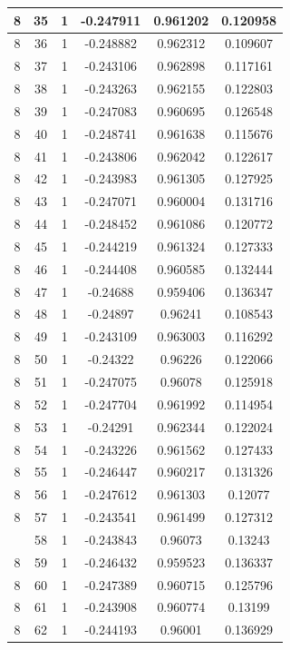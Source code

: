 \documentclass[12pt,a4paper]{article}
\numberwithin{equation}{section}
\numberwithin{figure}{section}
\numberwithin{table}{section}
\begin{document}
\begin{longtable}{|c|c|c|c|c|c|}
8 & 35 & 1 & -0.247911 & 0.961202 & 0.120958 \\ \hline
8 & 36 & 1 & -0.248882 & 0.962312 & 0.109607 \\ \hline
8 & 37 & 1 & -0.243106 & 0.962898 & 0.117161 \\ \hline
8 & 38 & 1 & -0.243263 & 0.962155 & 0.122803 \\ \hline
8 & 39 & 1 & -0.247083 & 0.960695 & 0.126548 \\ \hline
8 & 40 & 1 & -0.248741 & 0.961638 & 0.115676 \\ \hline
8 & 41 & 1 & -0.243806 & 0.962042 & 0.122617 \\ \hline
8 & 42 & 1 & -0.243983 & 0.961305 & 0.127925 \\ \hline
8 & 43 & 1 & -0.247071 & 0.960004 & 0.131716 \\ \hline
8 & 44 & 1 & -0.248452 & 0.961086 & 0.120772 \\ \hline
8 & 45 & 1 & -0.244219 & 0.961324 & 0.127333 \\ \hline
8 & 46 & 1 & -0.244408 & 0.960585 & 0.132444 \\ \hline
8 & 47 & 1 & -0.24688 & 0.959406 & 0.136347 \\ \hline
8 & 48 & 1 & -0.24897 & 0.96241 & 0.108543 \\ \hline
8 & 49 & 1 & -0.243109 & 0.963003 & 0.116292 \\ \hline
8 & 50 & 1 & -0.24322 & 0.96226 & 0.122066 \\ \hline
8 & 51 & 1 & -0.247075 & 0.96078 & 0.125918 \\ \hline
8 & 52 & 1 & -0.247704 & 0.961992 & 0.114954 \\ \hline
8 & 53 & 1 & -0.24291 & 0.962344 & 0.122024 \\ \hline
8 & 54 & 1 & -0.243226 & 0.961562 & 0.127433 \\ \hline
8 & 55 & 1 & -0.246447 & 0.960217 & 0.131326 \\ \hline
8 & 56 & 1 & -0.247612 & 0.961303 & 0.12077 \\ \hline
8 & 57 & 1 & -0.243541 & 0.961499 & 0.127312 \\ \hline
\pagebreak
8 & 58 & 1 & -0.243843 & 0.96073 & 0.13243 \\ \hline
8 & 59 & 1 & -0.246432 & 0.959523 & 0.136337 \\ \hline
8 & 60 & 1 & -0.247389 & 0.960715 & 0.125796 \\ \hline
8 & 61 & 1 & -0.243908 & 0.960774 & 0.13199 \\ \hline
8 & 62 & 1 & -0.244193 & 0.96001 & 0.136929 \\ \hline

\end{longtable}
\end{document}
